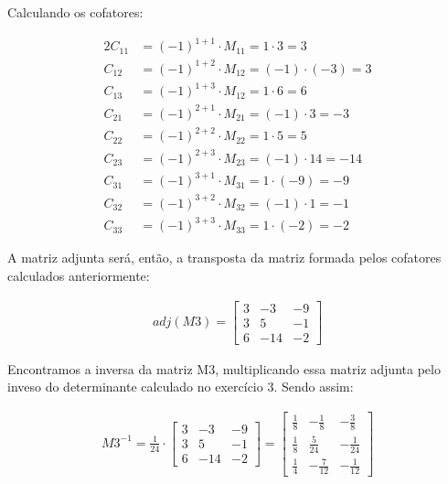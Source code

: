 \documentclass[a4paper,12pt]{article}
\begin{document}
Calculando os cofatores:

\begin{alignat*}{2}
  C_{11} &= (-1)^{1+1} \cdot M_{11} = 1 \cdot 3 = 3\\
  C_{12} &= (-1)^{1+2} \cdot M_{12} = (-1) \cdot (-3) = 3\\
  C_{13} &= (-1)^{1+3} \cdot M_{12} = 1 \cdot 6 = 6\\
  C_{21} &= (-1)^{2+1} \cdot M_{21} = (-1) \cdot 3 = -3\\
  C_{22} &= (-1)^{2+2} \cdot M_{22} = 1 \cdot 5 = 5\\
  C_{23} &= (-1)^{2+3} \cdot M_{23} = (-1) \cdot 14 = -14\\
  C_{31} &= (-1)^{3+1} \cdot M_{31} = 1 \cdot (-9) = -9\\
  C_{32} &= (-1)^{3+2} \cdot M_{32} = (-1) \cdot 1 = -1\\
  C_{33} &= (-1)^{3+3} \cdot M_{33} = 1 \cdot (-2) = -2
\end{alignat*}

\newpage

A matriz adjunta será, então, a transposta da matriz formada pelos cofatores calculados anteriormente:

\begin{align*}
  adj(M3) = 
  \begin{bmatrix}
    3 & -3 & -9\\
    3 & 5 & -1\\
    6 & -14 & -2
  \end{bmatrix}  
\end{align*}

Encontramos a inversa da matriz M3, multiplicando essa matriz adjunta pelo inveso do determinante calculado no exercício 3. Sendo assim:

\begin{align*}
  M3^{-1} = \frac{1}{24} \cdot
  \begin{bmatrix}
    3 & -3 & -9\\
    3 & 5 & -1\\
    6 & -14 & -2
  \end{bmatrix}  
  =
  \begin{bmatrix}
    \frac{1}{8} & -\frac{1}{8} & -\frac{3}{8}\\
    \frac{1}{8} & \frac{5}{24} & -\frac{1}{24}\\
    \frac{1}{4} & -\frac{7}{12} & -\frac{1}{12}
  \end{bmatrix}  
\end{align*}
\end{document}
